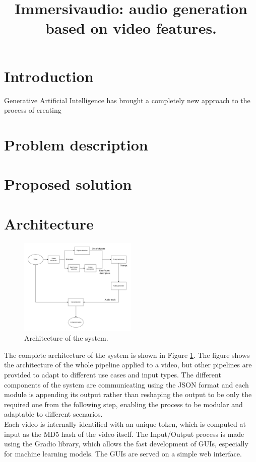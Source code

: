 \documentclass[conference]{IEEEtran}
\begin{document}
\title{Immersivaudio: audio generation based on video features.}

\author{
\and
{}
\and
{}
}

\maketitle
 
\section{Introduction}
Generative Artificial Intelligence has brought a completely new approach to the process of creating 

\section{Problem description}

\section{Proposed solution}

\section{Architecture}

\begin{figure}[h]
    \centerline{\includegraphics[width=0.5\textwidth]{final_architecture.png}}
    \caption{Architecture of the system.}
    \label{architecture}
\end{figure}
The complete architecture of the system is shown in Figure \ref{architecture}.
The figure shows the architecture of the whole pipeline applied to a video,
but other pipelines are provided to adapt to different use cases and input types.
The different components of the system are communicating using the JSON format and each module is appending its output rather than reshaping the output to be only the required one from the following step, enabling the process to be modular and adaptable to different scenarios.\\
Each video is internally identified with an unique token, which is computed at input as the MD5 hash of the video itself. 
The Input/Output process is made using the Gradio \cite{Gradio} library, which allows the fast development of GUIs, especially for machine learning models. The GUIs are served on a simple web interface.
 
\end{document}
